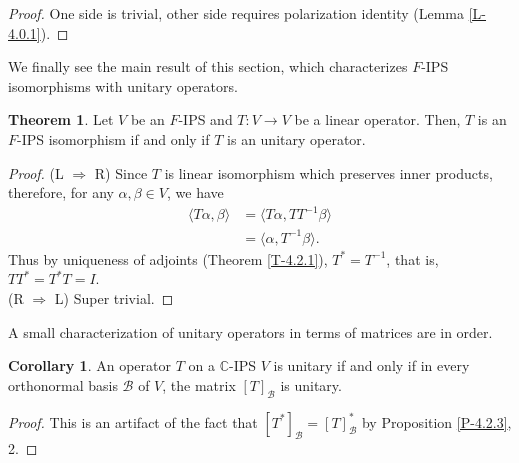 \documentclass[letterpaper,11pt,twoside]{article}
\theoremstyle{definition}
\theoremstyle{definition}
\newtheorem{theorem}[proposition]{Theorem}
\theoremstyle{definition}
\theoremstyle{definition}
\theoremstyle{definition}
\theoremstyle{definition}
\theoremstyle{remark}
\theoremstyle{definition}
\newtheorem{corollary}[proposition]{Corollary}
\newcommand{\ip}[2]{\langle #1,#2 \rangle}
\newcommand{\C}{\mathbb{C}}
\begin{document}
    \begin{proof}
    	One side is trivial, other side requires polarization identity (Lemma \ref{L-4.0.1}).
    \end{proof}
    We finally see the main result of this section, which characterizes $ F $-IPS isomorphisms with unitary operators.
    \begin{theorem}
    	Let $ V $ be an $ F $-IPS and $ T:V\to V $ be a linear operator. Then, $ T $ is an $ F $-IPS isomorphism if and only if $ T $ is an unitary operator.
    \end{theorem}
    \begin{proof}
    	(L $ \Rightarrow $ R) Since $ T $ is linear isomorphism which preserves inner products, therefore, for any $ \alpha,\beta\in V $, we have
    	\begin{align*}
    		\ip{T\alpha}{\beta} &= \ip{T\alpha}{TT^{-1}\beta}\\
    		&= \ip{\alpha}{T^{-1}\beta}.
    	\end{align*}
    	Thus by uniqueness of adjoints (Theorem \ref{T-4.2.1}), $ T^{*} = T^{-1} $, that is, $ TT^{*} = T^{*}T = I $.\\
    	(R $ \Rightarrow $ L) Super trivial.
    \end{proof}
	A small characterization of unitary operators in terms of matrices are in order.
	\begin{corollary}
		An operator $ T $ on a $ \C $-IPS $ V $ is unitary if and only if in every orthonormal basis $ \mathcal{B} $ of $ V $, the matrix $ [T]_{\mathcal{B}} $ is unitary.
	\end{corollary}
    \begin{proof}
    	This is an artifact of the fact that $ [T^{*}]_{\mathcal{B}} = [T]_{\mathcal{B}}^{*} $ by Proposition \ref{P-4.2.3}, 2.
    \end{proof}
\end{document}
